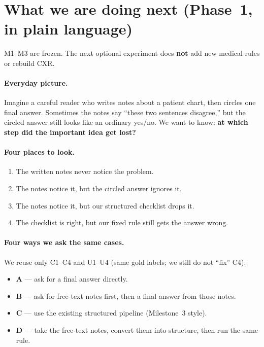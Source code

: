 \documentclass[11pt,a4paper]{article}
\begin{document}
\section{What we are doing next (Phase~1, in plain language)}

M1--M3 are frozen. The next optional experiment does \textbf{not} add new medical rules or rebuild CXR.

\paragraph{Everyday picture.}
Imagine a careful reader who writes notes about a patient chart, then circles one final answer.
Sometimes the notes say ``these two sentences disagree,'' but the circled answer still looks like an ordinary yes/no.
We want to know: \textbf{at which step did the important idea get lost?}

\paragraph{Four places to look.}
\begin{enumerate}
  \item The written notes never notice the problem.
  \item The notes notice it, but the circled answer ignores it.
  \item The notes notice it, but our structured checklist drops it.
  \item The checklist is right, but our fixed rule still gets the answer wrong.
\end{enumerate}

\paragraph{Four ways we ask the same cases.}
We reuse only C1--C4 and U1--U4 (same gold labels; we still do not ``fix'' C4):
\begin{itemize}
  \item \textbf{A} --- ask for a final answer directly.
  \item \textbf{B} --- ask for free-text notes first, then a final answer from those notes.
  \item \textbf{C} --- use the existing structured pipeline (Milestone~3 style).
  \item \textbf{D} --- take the free-text notes, convert them into structure, then run the same rule.
\end{itemize}
\end{document}
